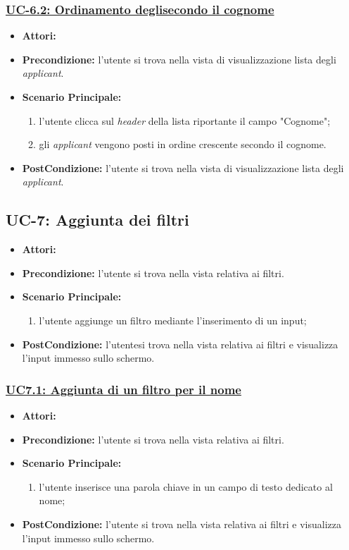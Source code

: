 \subsubsection{\underline{UC-6.2: Ordinamento degli\applicant secondo il cognome}}
\begin{itemize}
	\item \textbf{Attori:}\loggedusr
	\item \textbf{Precondizione:} l'utente si trova nella vista di visualizzazione lista degli \textit{applicant}.
	\item \textbf{Scenario Principale:}
	\begin{enumerate}
		\item l'utente clicca sul \textit{header} della lista riportante il campo "Cognome";
		\item gli \textit{applicant} vengono posti in ordine crescente secondo il cognome.
	\end{enumerate}
	\item \textbf{PostCondizione:}  l'utente si trova nella vista di visualizzazione lista degli \textit{applicant}.
\end{itemize}

\subsection{UC-7: Aggiunta dei filtri}
\begin{itemize}
\item \textbf{Attori:}\loggedusr
\item \textbf{Precondizione:} l'utente si trova nella vista relativa ai filtri.
\item \textbf{Scenario Principale:}
\begin{enumerate}
	\item l'utente aggiunge un filtro mediante l'inserimento di un input;
\end{enumerate}
\item \textbf{PostCondizione:} l'utentesi trova nella vista relativa ai filtri e visualizza l'input immesso sullo schermo.
\end{itemize}

\subsubsection{\underline{UC7.1: Aggiunta di un filtro per il nome}}
\begin{itemize}
\item \textbf{Attori:}\loggedusr
\item \textbf{Precondizione:} l'utente si trova nella vista relativa ai filtri.
\item \textbf{Scenario Principale:}
\begin{enumerate}
	\item l'utente inserisce una parola chiave in un campo di testo dedicato al nome;
\end{enumerate}
\item \textbf{PostCondizione:}  l'utente si trova nella vista relativa ai filtri e visualizza l'input immesso sullo schermo.
\end{itemize}

